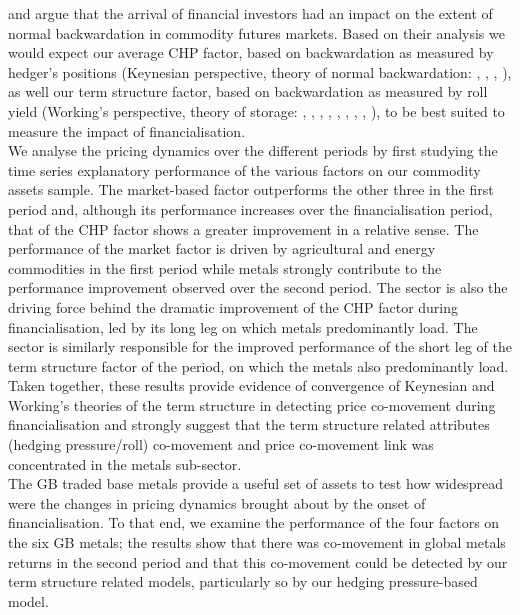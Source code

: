\documentclass[
  authoryear,
  preprint,
  3p]{elsarticle}
\begin{document}
\medskip

\citet{goldstein_speculation_2014} and \citet{goldstein_commodity_2022}
argue that the arrival of financial investors had an impact on the
extent of normal backwardation in commodity futures markets. Based on
their analysis we would expect our average CHP factor, based on
backwardation as measured by hedger's positions (Keynesian perspective,
theory of normal backwardation: \citet{keynes_treatise_1930},
\citet{hicks_value_1939}, \citet{houthakker_speculators_1957},
\citet{telser_futures_1958}), as well our term structure factor, based
on backwardation as measured by roll yield (Working's perspective,
theory of storage: \citet{working_price_1933},
\citet{kaldor_speculation_1939}, \citet{working_theory_1948},
\citet{brennan_supply_1958}, \citet{cootner_returns_1960},
\citet{weymar_supply_1966}, \citet{danthine_information_1978},
\citet{turnovsky_determination_1983}, \citet{schwartz_stochastic_1997}),
to be best suited to measure the impact of financialisation.\\
We analyse the pricing dynamics over the different periods by first
studying the time series explanatory performance of the various factors
on our commodity assets sample. The market-based factor outperforms the
other three in the first period and, although its performance increases
over the financialisation period, that of the CHP factor shows a greater
improvement in a relative sense. The performance of the market factor is
driven by agricultural and energy commodities in the first period while
metals strongly contribute to the performance improvement observed over
the second period. The sector is also the driving force behind the
dramatic improvement of the CHP factor during financialisation, led by
its long leg on which metals predominantly load. The sector is similarly
responsible for the improved performance of the short leg of the term
structure factor of the period, on which the metals also predominantly
load. Taken together, these results provide evidence of convergence of
Keynesian and Working's theories of the term structure in detecting
price co-movement during financialisation and strongly suggest that the
term structure related attributes (hedging pressure/roll) co-movement
and price co-movement link was concentrated in the metals sub-sector.\\
The GB traded base metals provide a useful set of assets to test how
widespread were the changes in pricing dynamics brought about by the
onset of financialisation. To that end, we examine the performance of
the four factors on the six GB metals; the results show that there was
co-movement in global metals returns in the second period and that this
co-movement could be detected by our term structure related models,
particularly so by our hedging pressure-based model.
\end{document}

